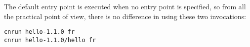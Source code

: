 The default entry point is executed when no entry point is specified, so from all the practical point of view, there is no difference in using these two invocations:

\begin{verbatim}
cnrun hello-1.1.0 fr
cnrun hello-1.1.0/hello fr
\end{verbatim}


